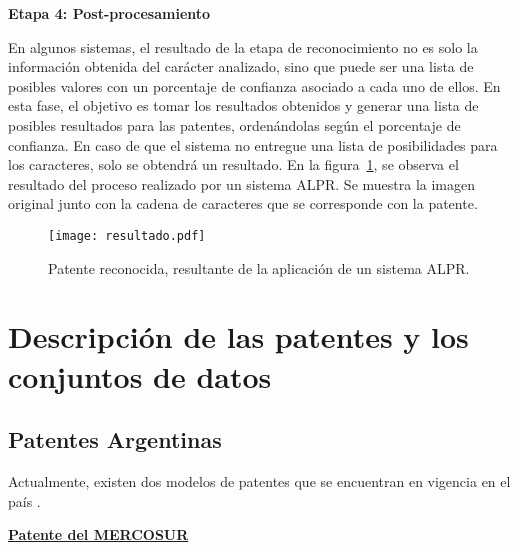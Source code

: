 \quad

\noindent \textbf{Etapa 4: Post-procesamiento}

En algunos sistemas, el resultado de la etapa de reconocimiento no es solo la información obtenida del carácter analizado, sino que puede ser una lista de posibles valores con un porcentaje de confianza asociado a cada uno de ellos. En esta fase, el objetivo es tomar los resultados obtenidos y generar una lista de posibles resultados para las patentes, ordenándolas según el porcentaje de confianza. En caso de que el sistema no entregue una lista de posibilidades para los caracteres, solo se obtendrá un resultado. En la figura~\ref{fig:img_result}, se observa el resultado del proceso realizado por un sistema ALPR. Se muestra la imagen original junto con la cadena de caracteres que se corresponde con la patente.

\begin{figure}[H]
	\centering
	\texttt{[image: resultado.pdf]}
	\caption{Patente reconocida, resultante de la aplicación de un sistema ALPR.}
	\label{fig:img_result}
\end{figure}


\section{Descripción de las patentes y los conjuntos de datos}\label{sec:placpatarg}

\subsection{Patentes Argentinas} \label{key:patentesarg}

Actualmente, existen dos modelos de patentes que se encuentran en vigencia en el país \cite{Res-33-14-PATNT-MERCOSUR} \cite{caracpat1} \cite{caracpat2}.

\quad

\noindent \underline{\textbf{Patente del MERCOSUR}}

